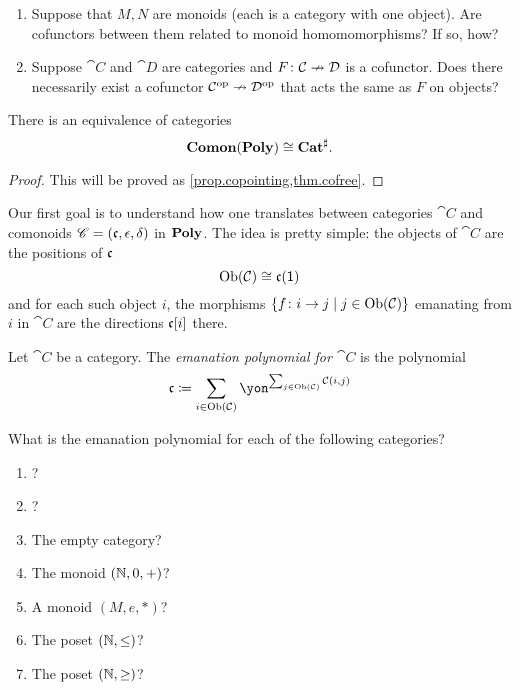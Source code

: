 \documentclass[Book-Poly]{subfiles}
\begin{document}
\begin{exercise}
\begin{enumerate}
	\item Suppose that $M,N$ are monoids (each is a category with one object). Are cofunctors between them related to monoid homomomorphisms? If so, how?
	\item Suppose $\cat{C}$ and $\cat{D}$ are categories and $F\colon\mathcal{C}\nrightarrow\mathcal{D}$ is a cofunctor. Does there necessarily exist a cofunctor $\mathcal{C}^{\textnormal{op}}\nrightarrow\mathcal{D}^{\textnormal{op}}$ that acts the same as $F$ on objects?
\qedhere
\end{enumerate}
\end{exercise}

\begin{theorem}\label{thm.ahman_uustalu}
There is an equivalence of categories
\[
\mathbf{Comon}(\mathbf{Poly})\cong\mathbf{Cat}^\sharp.
\]
\end{theorem}
\begin{proof}
This will be proved as \cref{prop.copointing,thm.cofree}.
\end{proof}

Our first goal is to understand how one translates between categories $\cat{C}$ and comonoids $\mathscr{C}=(\mathfrak{c},\epsilon,\delta)$ in $\mathbf{Poly}$. The idea is pretty simple: the objects of $\cat{C}$ are the positions of $\mathfrak{c}$
\[
\operatorname{Ob}(\mathcal{C})\cong\mathfrak{c}(\textsf{1})
\]
and for each such object $i$, the morphisms $\{f\colon i\to j\mid j\in\operatorname{Ob}(\mathcal{C})\}$ emanating from $i$ in $\cat{C}$ are the directions $\mathfrak{c}[i]$ there.

\begin{definition}
Let $\cat{C}$ be a category. The \emph{emanation polynomial for $\cat{C}$} is the polynomial
\[
\ema{c}\coloneqq\sum_{i\in\Ob(\cat{C})}\yon^{\sum_{j\in\Ob(\cat{C})}\cat{C}(i,j)}
\]
\end{definition}

\begin{exercise}
What is the emanation polynomial for each of the following categories?
\begin{enumerate}
	\item {}?
	\item {}?
	\item The empty category?
	\item The monoid $(\mathbb{N},0,+)$?
	\item A monoid $(M, e, *)$?
	\item The poset $(\mathbb{N},\leq)$?
	\item The poset $(\mathbb{N},\geq)$?
\qedhere
\end{enumerate}
\end{exercise}
\end{document}
